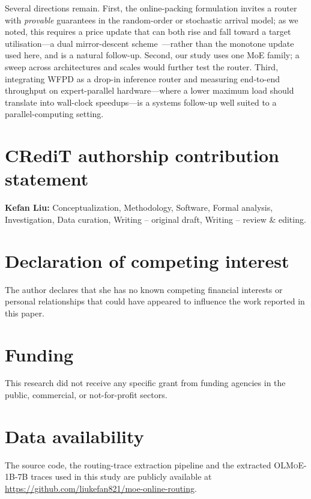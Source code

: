 \documentclass[preprint,12pt]{elsarticle}
\theoremstyle{plain}
\theoremstyle{remark}
\begin{document}
Several directions remain. First, the online-packing formulation invites a
router with \emph{provable} guarantees in the random-order or stochastic
arrival model; as we noted, this requires a price update that can both rise
and fall toward a target utilisation---a dual mirror-descent
scheme~\cite{blm}---rather than the monotone update used here, and is a
natural follow-up. Second, our study uses one MoE family; a sweep across
architectures and scales would further test the router. Third, integrating
WFPD as a drop-in inference router and measuring end-to-end throughput on
expert-parallel hardware---where a lower maximum load should translate into
wall-clock speedups---is a systems follow-up well suited to a
parallel-computing setting.

\section*{CRediT authorship contribution statement}
\textbf{Kefan Liu:} Conceptualization, Methodology, Software, Formal
analysis, Investigation, Data curation, Writing -- original draft, Writing
-- review \& editing.

\section*{Declaration of competing interest}
The author declares that she has no known competing financial interests or
personal relationships that could have appeared to influence the work
reported in this paper.

\section*{Funding}
This research did not receive any specific grant from funding agencies in
the public, commercial, or not-for-profit sectors.

\section*{Data availability}
The source code, the routing-trace extraction pipeline and the extracted
\textsc{OLMoE-1B-7B} traces used in this study are publicly available at
\url{https://github.com/liukefan821/moe-online-routing}.
\end{document}
